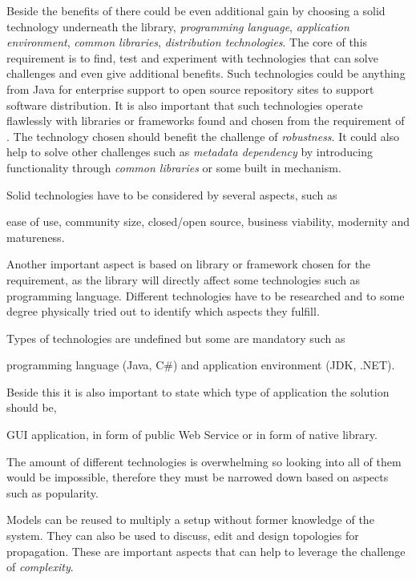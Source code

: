 Beside the benefits of  there could be even additional gain by choosing
a solid technology underneath the library, \eg \emph{programming language},
\emph{application environment}, \emph{common libraries}, \emph{distribution technologies}.
The core of this requirement is to find, test and experiment with technologies that can solve
challenges and even give additional benefits.
Such technologies could be anything from Java for enterprise support to open source repository
sites to support software distribution.
It is also important that such technologies operate flawlessly with libraries or frameworks
found and chosen from the requirement of .
The technology chosen should benefit the challenge of \emph{robustness}.
It could also help to solve other challenges such as \emph{metadata dependency} by introducing
functionality through \emph{common libraries} or some built in mechanism.

Solid technologies have to be considered by several aspects, such as
\begin{ii}
  \iitem ease of use,
  \iitem community size,
  \iitem closed/open source,
  \iitem business viability,
  \iitem modernity and 
  \iitem matureness.
\end{ii}
Another important aspect is based on library or framework chosen for the  requirement,
as the library will directly affect some technologies such as programming language.
Different technologies have to be researched and to some degree physically tried out to identify
which aspects they fulfill.

Types of technologies are undefined but some are mandatory such as 
\begin{ii}
  \iitem programming language (\eg Java, C\#) and 
  \iitem application environment (\eg JDK, .NET).
\end{ii}
Beside this it is also important to state which type of application the solution should be, 
\begin{ii}
  \iitem GUI application,
  \iitem {} in form of public Web Service or
  \iitem {} in form of native library.
\end{ii}
The amount of different technologies is overwhelming so looking into all of them would be impossible,
therefore they must be narrowed down based on aspects such as popularity.

Models can be reused to multiply a setup without former knowledge of the system.
They can also be used to discuss, edit and design topologies for propagation. 
These are important aspects that can help to leverage the challenge of \emph{complexity}.

